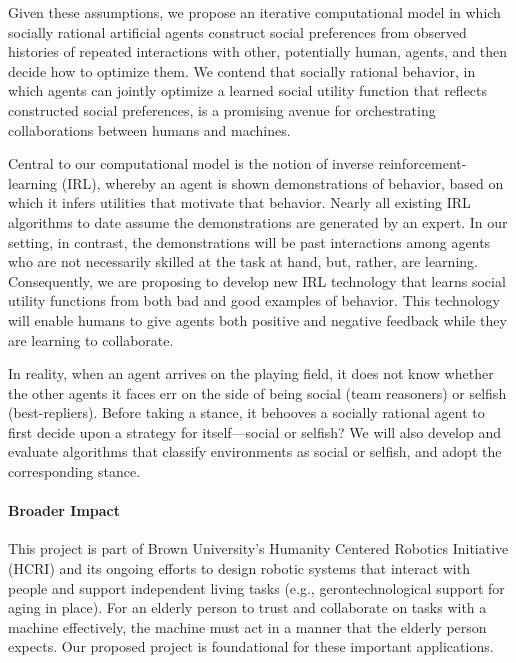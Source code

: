 Given these assumptions, we propose an iterative computational model
in which socially rational artificial agents construct social
preferences from observed histories of repeated interactions with
other, potentially human, agents, and then decide how to optimize
them.  We contend that socially rational behavior, in which agents can
jointly optimize a learned social utility function that reflects
constructed social preferences, is a promising avenue for
orchestrating collaborations between humans and machines.

Central to our computational model is the notion of inverse
reinforcement-learning (IRL), whereby an agent is shown demonstrations
of behavior, based on which it infers utilities that motivate that
behavior.  Nearly all existing IRL algorithms to date assume the
demonstrations are generated by an expert.  In our setting, in
contrast, the demonstrations will be past interactions among agents
who are not necessarily skilled at the task at hand, but, rather, are learning.
Consequently, we are proposing to develop
new IRL technology that learns social utility functions from
both bad and good examples of behavior.  This technology will enable
humans to give agents both positive and negative feedback while they
are learning to collaborate.

In reality, when an agent arrives on the playing field, it does not
know whether the other agents it faces err on the side of being social
(team reasoners) or selfish (best-repliers).  Before taking a stance,
it behooves a socially rational agent to first decide upon a strategy
for itself---social or selfish?
%
We will also develop and evaluate algorithms that classify
environments as social or selfish, and adopt the corresponding stance.



\vspace{\up}
\paragraph{Broader Impact}
%
This project is part of Brown University's Humanity Centered
Robotics Initiative (HCRI) and its ongoing efforts to design robotic
systems that interact with people and support independent living tasks
(e.g., gerontechnological support for aging in place).  For an elderly
person to trust and collaborate on tasks with a machine effectively,
the machine must act in a manner that the elderly person expects.  Our
proposed project is foundational for these
important applications.

